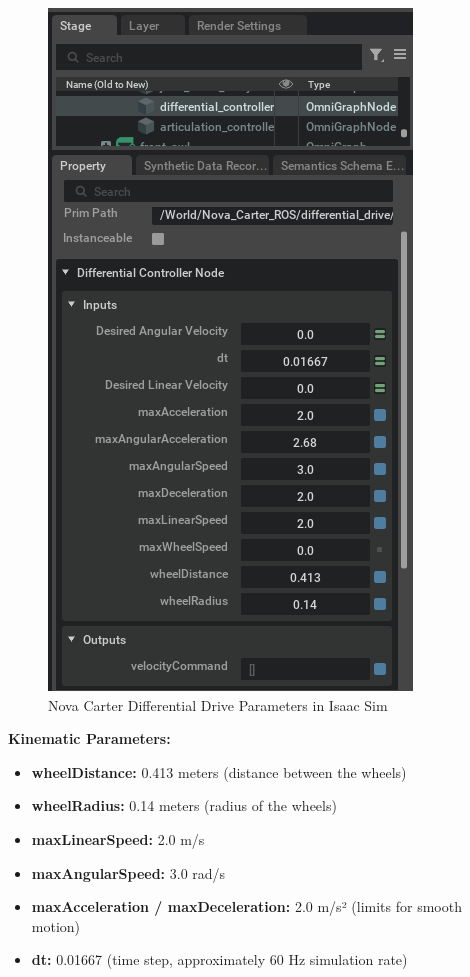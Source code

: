\documentclass[
  letterpaper,
  DIV=11,
  numbers=noendperiod]{scrartcl}
\providecommand{\tightlist}{%
  \setlength{\itemsep}{0pt}\setlength{\parskip}{0pt}}\usepackage{longtable,booktabs,array}
\begin{document}
\begin{figure}

{\centering \includegraphics{differential-controller.png}

}

\caption{\label{fig-differential-controller}Nova Carter Differential
Drive Parameters in Isaac Sim}

\end{figure}

\textbf{Kinematic Parameters:}

\begin{itemize}
\tightlist
\item
  \textbf{wheelDistance:} 0.413 meters (distance between the wheels)
\item
  \textbf{wheelRadius:} 0.14 meters (radius of the wheels)
\item
  \textbf{maxLinearSpeed:} 2.0 m/s
\item
  \textbf{maxAngularSpeed:} 3.0 rad/s
\item
  \textbf{maxAcceleration / maxDeceleration:} 2.0 m/s² (limits for
  smooth motion)
\item
  \textbf{dt:} 0.01667 (time step, approximately 60 Hz simulation rate)
\end{itemize}
\end{document}
